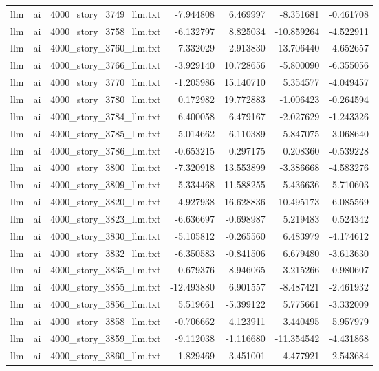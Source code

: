 \begin{longtable}{lllrrrr}
llm & ai & 4000\_story\_3749\_llm.txt & -7.944808 & 6.469997 & -8.351681 & -0.461708 \\
llm & ai & 4000\_story\_3758\_llm.txt & -6.132797 & 8.825034 & -10.859264 & -4.522911 \\
llm & ai & 4000\_story\_3760\_llm.txt & -7.332029 & 2.913830 & -13.706440 & -4.652657 \\
llm & ai & 4000\_story\_3766\_llm.txt & -3.929140 & 10.728656 & -5.800090 & -6.355056 \\
llm & ai & 4000\_story\_3770\_llm.txt & -1.205986 & 15.140710 & 5.354577 & -4.049457 \\
llm & ai & 4000\_story\_3780\_llm.txt & 0.172982 & 19.772883 & -1.006423 & -0.264594 \\
llm & ai & 4000\_story\_3784\_llm.txt & 6.400058 & 6.479167 & -2.027629 & -1.243326 \\
llm & ai & 4000\_story\_3785\_llm.txt & -5.014662 & -6.110389 & -5.847075 & -3.068640 \\
llm & ai & 4000\_story\_3786\_llm.txt & -0.653215 & 0.297175 & 0.208360 & -0.539228 \\
llm & ai & 4000\_story\_3800\_llm.txt & -7.320918 & 13.553899 & -3.386668 & -4.583276 \\
llm & ai & 4000\_story\_3809\_llm.txt & -5.334468 & 11.588255 & -5.436636 & -5.710603 \\
llm & ai & 4000\_story\_3820\_llm.txt & -4.927938 & 16.628836 & -10.495173 & -6.085569 \\
llm & ai & 4000\_story\_3823\_llm.txt & -6.636697 & -0.698987 & 5.219483 & 0.524342 \\
llm & ai & 4000\_story\_3830\_llm.txt & -5.105812 & -0.265560 & 6.483979 & -4.174612 \\
llm & ai & 4000\_story\_3832\_llm.txt & -6.350583 & -0.841506 & 6.679480 & -3.613630 \\
llm & ai & 4000\_story\_3835\_llm.txt & -0.679376 & -8.946065 & 3.215266 & -0.980607 \\
llm & ai & 4000\_story\_3855\_llm.txt & -12.493880 & 6.901557 & -8.487421 & -2.461932 \\
llm & ai & 4000\_story\_3856\_llm.txt & 5.519661 & -5.399122 & 5.775661 & -3.332009 \\
llm & ai & 4000\_story\_3858\_llm.txt & -0.706662 & 4.123911 & 3.440495 & 5.957979 \\
llm & ai & 4000\_story\_3859\_llm.txt & -9.112038 & -1.116680 & -11.354542 & -4.431868 \\
llm & ai & 4000\_story\_3860\_llm.txt & 1.829469 & -3.451001 & -4.477921 & -2.543684 \\

\end{longtable}

